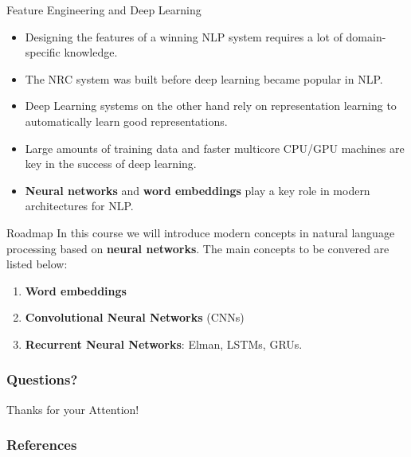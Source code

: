 \documentclass[handout]{beamer}
\begin{document}
\begin{frame}{Feature Engineering and Deep Learning}
\begin{scriptsize}
\begin{itemize}
\item Designing the features of a winning NLP system requires a lot of domain-specific knowledge.
\item The NRC system was built before deep learning became popular in NLP.
\item Deep Learning systems on the other hand rely on representation learning to automatically learn good representations.
\item Large amounts of training data and faster multicore CPU/GPU machines are key in the success of deep learning. 
\item \textbf{Neural networks} and \textbf{word embeddings} play a key role in modern  architectures for NLP.
\end{itemize}
\end{scriptsize}
\end{frame}




\begin{frame}{Roadmap}
In this course we will introduce modern concepts in natural language processing based on \textbf{neural networks}. The main concepts to be convered are listed below:
\begin{scriptsize}
\begin{enumerate}
\item  \textbf{Word embeddings}
\item  \textbf{Convolutional Neural Networks} (CNNs) 
\item \textbf{Recurrent Neural Networks}: Elman, LSTMs, GRUs. 
\end{enumerate} 
\end{scriptsize}
\end{frame}





\begin{frame}
\frametitle{Questions?}
\begin{center}\LARGE Thanks for your Attention!\\ \end{center}



\end{frame}

\begin{frame}[allowframebreaks]\scriptsize
\frametitle{References}


%
\end{frame}  


\end{document}
